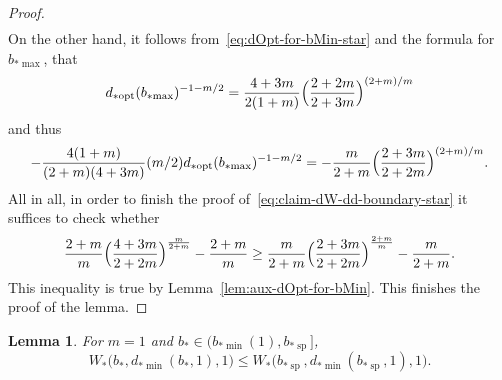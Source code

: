 \documentclass[a4paper]{amsart} %
\newtheorem{lemma}[theorem]{Lemma}
\theoremstyle{definition}
\theoremstyle{remark}
\numberwithin{equation}{section}
\newcommand*{\bStar}{b_*}
\newcommand*{\XXXspecialbdStar}{W_*}
\newcommand*{\bMinStar}{b_{*\!\min}}
\newcommand*{\bMaxStar}{b_{*\!\max}}
\newcommand*{\dMinStar}{d_{*\!\min}}
\newcommand*{\dOptStar}{d_{*\!\operatorname{opt}}}
\newcommand*{\bShStar}{b_{*\!\operatorname{sp}}}
\begin{document}
\begin{proof}
\begin{align*}
	\end{align*}
	On the other hand, it follows from~\eqref{eq:dOpt-for-bMin-star}
	and the formula for $\bMaxStar$,
	that
	\[
	\dOptStar(\bMaxStar)^{-1-m/2} = \frac{4+3m}{2(1+m)} \Bigl( \frac{2+2m}{2+3m}\Bigr)^{(2+m)/m}
	\]
	and thus
	\begin{equation*}
	-\frac{4(1+m)}{(2+m)(4+3m)}(m/2)\dOptStar(\bMaxStar)^{-1-m/2}
	=-\frac{m}{2+m}\Bigl(\frac{2+3m}{2+2m}\Bigr)^{(2+m)/m} .
	\end{equation*}
	All in all, in order to finish the proof of~\eqref{eq:claim-dW-dd-boundary-star}
	it suffices to check whether
	\[
	\frac{2+m}{m}\Bigl(\frac{4+3m}{2+2m}\Bigr)^{\frac{m}{2+m}} - \frac{2+m}{m} \geq 
	\frac{m}{2+m}\Bigl(\frac{2+3m}{2+2m}\Bigr)^{\frac{2+m}{m}} - \frac{m}{2+m}.
	\]
	This inequality is true by Lemma~\ref{lem:aux-dOpt-for-bMin}.
	This finishes the proof of the lemma.
\end{proof}

\begin{lemma} %
	\label{lem:lower-bound-fixed-m-special-b-c-d-boundary-bSh-star}
	For $m=1$ and $\bStar\in (\bMinStar(1), \bShStar]$,
	\begin{equation}
	\label{eq:claim-W-boundary-bSh-star}
	\XXXspecialbdStar\bigl(\bStar, \dMinStar(\bStar,1), 1\bigr)
	\leq 
	\XXXspecialbdStar\bigl(\bShStar, \dMinStar(\bShStar,1), 1\bigr).
	\end{equation}
\end{lemma}
\end{document}
